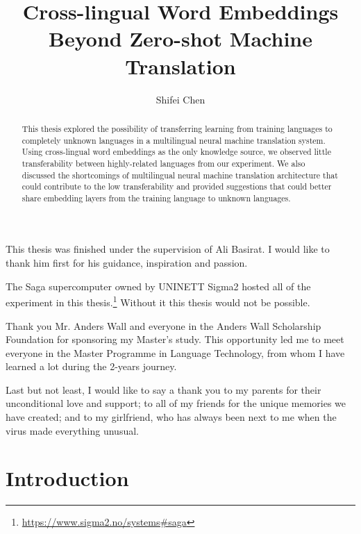 \documentclass[thesis,fonts=libertine]{cluu}
\begin{document}
\author{Shifei Chen}
\title{Cross-lingual Word Embeddings Beyond Zero-shot Machine Translation}

\maketitle

\begin{abstract}
  This thesis explored the possibility of transferring learning from training languages to completely unknown languages in a multilingual neural machine translation system. Using cross-lingual word embeddings as the only knowledge source, we observed little transferability between highly-related languages from our experiment. We also discussed the shortcomings of multilingual neural machine translation architecture that could contribute to the low transferability and provided suggestions that could better share embedding layers from the training language to unknown languages.
\end{abstract}

\tableofcontents


This thesis was finished under the supervision of Ali Basirat. I would like 
to thank him first for his guidance, inspiration and passion.

The Saga supercomputer owned by UNINETT Sigma2 hosted all of the experiment in this thesis.\footnote{\url{https://www.sigma2.no/systems\#saga}} Without it this thesis would not be possible.

Thank you Mr. Anders Wall and everyone in the Anders Wall Scholarship Foundation for sponsoring my Master's study. This opportunity led me to meet everyone in the Master Programme in Language Technology, from whom I have learned a lot during the 2-years journey.

Last but not least, I would like to say a thank you to my parents for their unconditional love and support; to all of my friends for the unique memories we have created; and to my girlfriend, who has always been next to me when the virus made everything unusual.


\chapter{Introduction}
\end{document}
